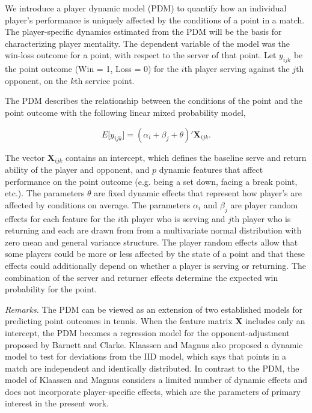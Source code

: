 \documentclass{Latex/svjour3}
\begin{document}
We introduce a player dynamic model (PDM) to quantify how an individual
player's performance is uniquely affected by the conditions of a point
in a match. The player-specific dynamics estimated from the PDM will
be the basis for characterizing player mentality. The dependent
variable of the model was the win-loss outcome for a point, with
respect to the server of that point. Let $y_{ijk}$ be the point outcome
(Win = 1, Loss = 0) for the $i$th player serving against the $j$th opponent, on the $k$th service
point. 

The PDM describes the relationship between the conditions of
the point and the point outcome with the following linear mixed
probability model, 

\begin{equation}
E\lbrack y_{ijk} \rbrack = (\alpha_{i} + \beta_{j} + \theta)' \mathbf{X}_{ijk}.
\label{eq:pdm}
\end{equation}

\noindent The vector $\mathbf{X}_{ijk}$ contains an intercept, which
defines the baseline serve and return ability of the player and opponent, and $p$
dynamic features that affect performance on the point outcome (e.g. being a
set down, facing a break point, etc.). The parameters $\theta$ are
fixed dynamic effects that represent how player's are affected by
conditions on average. The parameters $\alpha_i$ and $\beta_j$ are
player random effects for each feature for the $i$th player who is
serving and $j$th
player who is returning and each are drawn from  from a
multivariate normal distribution with zero mean and general variance
structure. The player random effects allow
that some players could be more or less affected by the state of a
point and that these effects could additionally depend on whether a player
is serving or returning. The combination of the server and returner
effects determine the expected win probability for the
point. 

\textit{Remarks.} The PDM can be viewed as an extension of two
established models for predicting point outcomes in tennis. When the
feature matrix $\mathbf{X}$ includes only an intercept, the PDM
becomes a regression model for the opponent-adjustment proposed by Barnett and
Clarke. Klaassen and Magnus also proposed a dynamic model to test for
deviations from the IID model, which says that points in a match are
independent and identically distributed. In contrast to the PDM, the model of Klaassen and Magnus considers a limited number of
dynamic effects and does not incorporate player-specific
effects, which are the parameters of primary interest in the present work.
\end{document}
